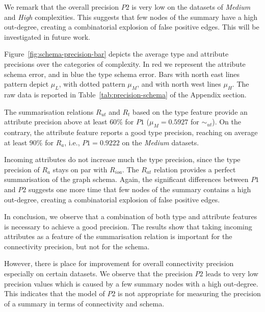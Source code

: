 We remark that the overall precision $P2$ is very low on the datasets of \emph{Medium} and \emph{High} complexities. This suggests that few nodes of the summary have a high out-degree, creating a combinatorial explosion of false positive edges. This will be investigated in future work.




Figure~\ref{fig:schema-precision-bar} depicts the average type and attribute precisions over the categories of complexity.
In red we represent the attribute schema error, and in blue the type schema error. Bars with north east lines pattern depict $\mu_{L}$, with dotted pattern $\mu_{M}$, and with north west lines $\mu_{H}$.
The raw data is reported in Table~\ref{tab:precision-schema} of the Appendix section.

The summarisation relations $R_{ut}$ and $R_t$ based on the type feature provide an attribute precision above at least $60\%$ for $P1$ ($\mu_M=0.5927$ for $\sim_{ut}$).
On the contrary, the attribute feature reports a good type precision, reaching on average at least $90\%$ for $R_a$, i.e., $P1=0.9222$ on the \emph{Medium} datasets.

Incoming attributes do not increase much the type precision, since the type precision of $R_a$ stays on par with $R_{ioa}$. The $R_{at}$ relation provides a perfect summarisation of the graph schema. Again, the significant differences between $P1$ and $P2$ suggests one more time that few nodes of the summary contains a high out-degree, creating a combinatorial explosion of false positive edges.




In conclusion, we observe that a combination of both type and attribute features is necessary to achieve a good precision. The results show that taking incoming attributes as a feature of the summarisation relation is important for the connectivity precision, but not for the schema.

However, there is place for improvement for overall connectivity precision especially on certain datasets. We observe that the precision $P2$ leads to very low precision values which is caused by a few summary nodes with a high out-degree. This indicates that the model of $P2$ is not appropriate for measuring the precision of a summary in terms of connectivity and schema.

